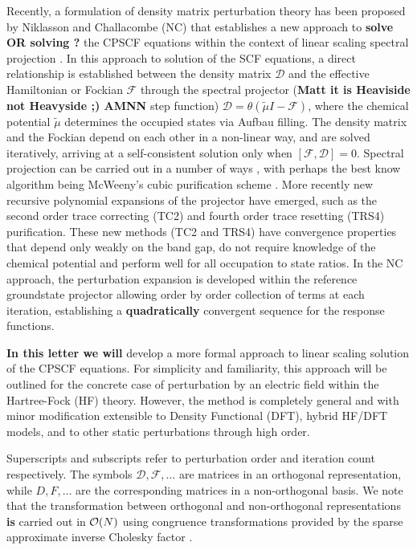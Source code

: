 \documentclass[prl,aps,twocolumn,showpacs,twocolumngrid,superbib]{revtex4}
\begin{document}
Recently, a formulation of density matrix perturbation theory has been proposed 
by Niklasson and Challacombe (NC) \cite{} that establishes a new approach to {\bf solve OR solving ?}
the CPSCF equations within the context of linear scaling spectral projection \cite{}.  
In this approach to solution of the SCF equations, a direct relationship is established between 
the density matrix $\mathcal{D}$  and the effective Hamiltonian or Fockian $\mathcal{F}$ through 
the spectral projector ({\bf Matt it is Heaviside not Heavyside ;) AMNN } step function)
 $\mathcal{D}=\theta(\tilde{\mu}I-\mathcal{F})$, 
where the chemical potential $\tilde{\mu}$ determines the occupied states via Aufbau filling.   
The density matrix and the Fockian depend on each other in a non-linear way, and are solved
iteratively, arriving at a self-consistent solution only when $[\mathcal{F},\mathcal{D}]=0$.
Spectral projection can be carried out in a number of ways \cite{}, with perhaps the best
know algorithm being McWeeny's cubic purification scheme \cite{}. 
More recently new recursive polynomial expansions of the projector have emerged, 
such as the second order trace correcting (TC2) \cite{} and fourth order trace resetting 
(TRS4) \cite{} purification.  These new methods (TC2 and TRS4) have convergence properties 
that depend only weakly on the band gap, do not require knowledge of the chemical potential
and perform well for all occupation to state ratios. In the NC approach, 
the perturbation expansion is developed within the reference groundstate projector allowing 
order by order collection of terms at each iteration, establishing a {\bf quadratically}
 convergent sequence for
the response functions.  

{\bf In this letter we will} develop a more formal approach to linear scaling
 solution of the CPSCF equations.
For simplicity and familiarity, this approach will be outlined for the concrete case of 
perturbation by an electric field within the Hartree-Fock (HF) theory.  However, the method is 
completely general and with minor modification extensible to Density Functional (DFT), hybrid 
HF/DFT models, and to other static perturbations through high order.

Superscripts and subscripts refer to perturbation order and iteration count respectively.  
The symbols $\mathcal{D},\mathcal{F},\dots$  are  matrices in an orthogonal representation, while
$D,F,\dots$ are the corresponding matrices in a non-orthogonal basis.  We note that the transformation 
between orthogonal and non-orthogonal representations {\bf is} carried out in ${\cal O}(N)$ using
congruence transformations provided by the sparse approximate inverse Cholesky factor \cite{}.  
\end{document}
